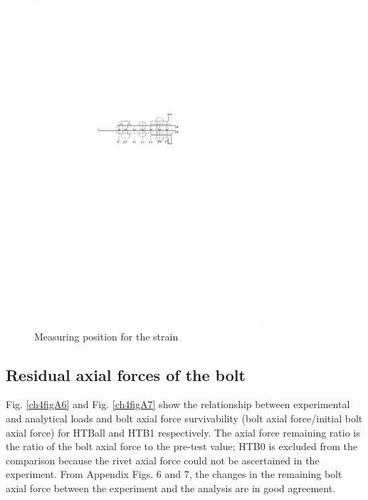 \begin{figure}[htbp]
    \centering
    \includegraphics[width=0.75\textwidth]{imgs/ch4/figA5.pdf}
    \caption{Measuring position for the strain}
    \label{ch4figA5}
\end{figure}

\subsection{Residual axial forces of the bolt}

Fig. \ref{ch4figA6} and Fig. \ref{ch4figA7} show the relationship between experimental and analytical loads and bolt axial force survivability (bolt axial force/initial bolt axial force) for HTBall and HTB1 respectively. The axial force remaining ratio is the ratio of the bolt axial force to the pre-test value; HTB0 is excluded from the comparison because the rivet axial force could not be ascertained in the experiment.
From Appendix Figs. 6 and 7, the changes in the remaining bolt axial force between the experiment and the analysis are in good agreement.

